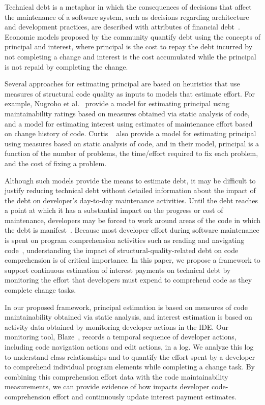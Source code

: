 Technical debt is a metaphor in which the consequences of decisions that affect the maintenance of a software system, such as decisions regarding architecture and development practices, are described with attributes of financial debt~\cite{Cunningham:1992}. Economic models proposed by the \TD community quantify debt using the concepts of principal and interest, where principal is the cost to repay the debt incurred by not completing a change and interest is the cost accumulated while the principal is not repaid by completing the change.

Several approaches for estimating principal are based on heuristics that use measures of structural code quality as inputs to models that estimate effort. For example, Nugroho et al.~\cite{Nugroho_etal:2011} provide a model for estimating principal using maintainability ratings based on measures obtained via static analysis of code, and a model for estimating interest using estimates of maintenance effort based on change history of code. Curtis \etal~\cite{Curtis_etal:2012} also provide a model for estimating principal using measures based on static analysis of code, and in their model, principal is a function of the number of problems, the time/effort required to fix each problem, and the cost of fixing a problem.  

Although such models provide the means to estimate debt, it may be difficult to justify reducing technical debt without detailed information about the impact of the debt on developer's day-to-day maintenance activities. Until the debt reaches a point at which it has a substantial impact on the progress or cost of maintenance, developers may be forced to work around areas of the code in which the debt is manifest~\cite{Ozkaya_etal:2011}. Because most developer effort during software maintenance is spent on program comprehension activities such as reading and navigating code~\cite{Fjeldstad_Hamlen:1982,Standish:1984,vonMayrhauser_etal:1997,Ko_etal:2006,LaToza_etal:2006,Tiarks:2011}, understanding the impact of structural-quality-related debt on code comprehension is of critical importance. In this paper, we propose a framework to support continuous estimation of interest payments on technical debt by monitoring the effort that developers must expend to comprehend code as they complete change tasks. 

In our proposed framework, principal estimation is based on measures of code maintainability obtained via static analysis, and interest estimation is based on activity data obtained by monitoring developer actions in the IDE. Our monitoring tool, Blaze~\cite{Snipes_etal:2014}, records a temporal sequence of developer actions, including code navigation actions and edit actions, in a log. We analyze this log to understand class relationships and to quantify the effort spent by a developer to comprehend individual program elements while completing a change task. By combining this comprehension effort data with the code maintainability measurements, we can provide evidence of how \TD impacts developer code-comprehension effort and continuously update interest payment estimates.

